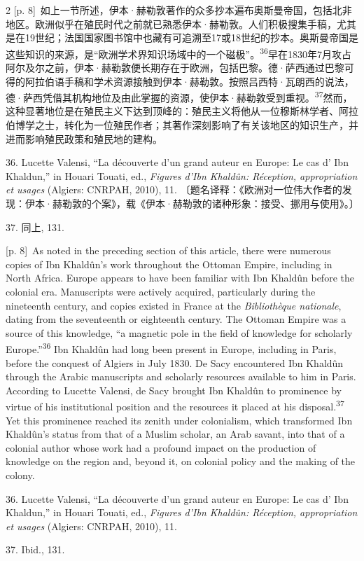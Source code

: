 \documentclass[10pt,a4paper]{article}
\begin{document}
\begin{paracol}{2}
{\scriptsize\color{gray} [p. 8]}\ 如上一节所述，伊本·赫勒敦著作的众多抄本遍布奥斯曼帝国，包括北非地区。欧洲似乎在殖民时代之前就已熟悉伊本·赫勒敦。人们积极搜集手稿，尤其是在19世纪；法国国家图书馆中也藏有可追溯至17或18世纪的抄本。奥斯曼帝国是这些知识的来源，是“欧洲学术界知识场域中的一个磁极”。\nobreak\textsuperscript{36}早在1830年7月攻占阿尔及尔之前，伊本·赫勒敦便长期存在于欧洲，包括巴黎。德·萨西通过巴黎可得的阿拉伯语手稿和学术资源接触到伊本·赫勒敦。按照吕西特·瓦朗西的说法，德·萨西凭借其机构地位及由此掌握的资源，使伊本·赫勒敦受到重\mbox{视。\textsuperscript{37}}然而，这种显著地位是在殖民主义下达到顶峰的：殖民主义将他从一位穆斯林学者、阿拉伯博学之士，转化为一位殖民作者；其著作深刻影响了有关该地区的知识生产，并进而影响殖民政策和殖民地的建构。\par{\small 36. Lucette Valensi, “La découverte d’un grand auteur en Europe: Le cas d’ Ibn Khaldun,” in Houari Touati, ed., \textit{Figures d’Ibn Khaldûn: Réception, appropriation et usages} (Algiers: CNRPAH, 2010), 11. 〔题名译释：《欧洲对一位伟大作者的发现：伊本·赫勒敦的个案》，载《伊本·赫勒敦的诸种形象：接受、挪用与使用》。〕\par}{\small 37. 同上, 131.\par}
\switchcolumn
{\scriptsize\color{gray} [p. 8]}\ As noted in the preceding section of this article, there were numerous copies of Ibn Khaldûn’s work throughout the Ottoman Empire, including in North Africa. Europe appears to have been familiar with Ibn Khaldûn before the colonial era. Manuscripts were actively acquired, particularly during the nineteenth century, and copies existed in France at the \textit{Bibliothèque nationale}, dating from the seventeenth or eighteenth century. The Ottoman Empire was a source of this knowledge, “a magnetic pole in the field of knowledge for scholarly Europe.”\nobreak\textsuperscript{36} Ibn Khaldûn had long been present in Europe, including in Paris, before the conquest of Algiers in July 1830. De Sacy encountered Ibn Khaldûn through the Arabic manuscripts and scholarly resources available to him in Paris. According to Lucette Valensi, de Sacy brought Ibn Khaldûn to prominence by virtue of his institutional position and the resources it placed at his disposal.\nobreak\textsuperscript{37} Yet this prominence reached its zenith under colonialism, which transformed Ibn Khaldûn’s status from that of a Muslim scholar, an Arab savant, into that of a colonial author whose work had a profound impact on the production of knowledge on the region and, beyond it, on colonial policy and the making of the colony.\par{\small 36. Lucette Valensi, “La découverte d’un grand auteur en Europe: Le cas d’ Ibn Khaldun,” in Houari Touati, ed., \textit{Figures d’Ibn Khaldûn: Réception, appropriation et usages} (Algiers: CNRPAH, 2010), 11.\par}{\small 37. Ibid., 131.\par}

\end{paracol}
\end{document}
